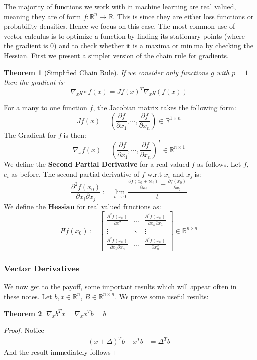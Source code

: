 \documentclass[]{article}
\theoremstyle{mattstyle}
\newtheorem{theorem}{Theorem}[section]
\theoremstyle{definition}
\begin{document}
The majority of functions we work with in machine learning are real valued, meaning they are of form $f: \mathbb{R}^n \rightarrow \mathbb{R}$. This is since they are either loss functions or probability densities. Hence we focus on this case. The most common use of vector calculus is to optimize a function by finding its stationary points (where the gradient is 0) and to check whether it is a maxima or minima by checking the Hessian. First we present a simpler version of the chain rule for gradients.
\begin{theorem}[Simplified Chain Rule]
If we consider only functions $g$ with $p=1$ then the gradient is: $$\nabla_x g \circ f(x) = Jf(x)^T\nabla_{x}g(f(x))$$
\end{theorem} 
For a many to one function $f$, the Jacobian matrix takes the following form: 
$$J f(x) = \left(\frac{\partial f}{\partial x_1}, \cdots, \frac{\partial f}{\partial x_n}\right) \in \mathbb{R}^{1 \times n}$$
The Gradient for $f$ is then: 
$$\nabla_{x} f(x) = \left(\frac{\partial f}{\partial x_1}, \cdots, \frac{\partial f}{\partial x_n}\right)^T \in \mathbb{R}^{n \times 1}$$
We define the \textbf{Second Partial Derivative} for a real valued $f$ as follows. Let $f$, $e_i$ as before. The second partial derivative of $f$ w.r.t $x_i$ and $x_j$ is:
$$
\frac{\partial^2 f(x_0)}{\partial x_i \partial x_j} := 
\lim\limits_{t \rightarrow 0} \frac{ \frac{\partial f(x_0+te_i)}{\partial x_j} - \frac{\partial f(x_0)}{\partial x_j} }{t}
$$
We define the \textbf{Hessian} for real valued functions as: 
$$H f(x_0) := \begin{bmatrix}
\frac{\partial^2 f(x_0)}{\partial x_1^2} & \dots  & \frac{\partial^2 f(x_0)}{\partial x_n \partial x_1} \\
\vdots & \ddots & \vdots \\
\frac{\partial^2 f(x_0)}{\partial x_1 \partial x_n} & \dots  & \frac{\partial^2 f(x_0)}{\partial x_n^2}
\end{bmatrix}\in \mathbb{R}^{n \times n}$$

\newpage

\subsubsection{Vector Derivatives}

We now get to the payoff, some important results which will appear often in these notes. Let $b,x \in \mathbb{R}^n$, $B \in \mathbb{R}^{n \times n}$. We prove some useful results:

\begin{theorem}
	$\nabla_{x} b^Tx = \nabla_{x} x^Tb= b$
\end{theorem}
\begin{proof}
	Notice 
	\begin{align*}
	(x+\Delta)^Tb - x^Tb &= \Delta^Tb
	\end{align*}
	And the result immediately follows
\end{proof}
\end{document}
